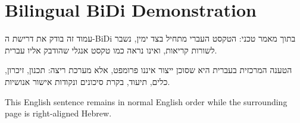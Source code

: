 \chapter{Bilingual BiDi Demonstration}
\begin{hebrew}
\begin{flushright}
עמוד זה בודק את דרישת ה-BiDi בתוך מאמר טכני: הטקסט העברי מתחיל בצד ימין, נשבר לשורות קריאות, ואינו נראה כמו טקסט אנגלי שהודבק אליו עברית.

הטענה המרכזית בעברית היא שסוכן ייצור איננו פרומפט, אלא מערכת ריצה: תכנון, זיכרון, כלים, תיעוד, בקרת סיכונים ונקודות אישור אנושיות.
\end{flushright}
\end{hebrew}

This English sentence remains in normal English order while the surrounding page is right-aligned Hebrew.
